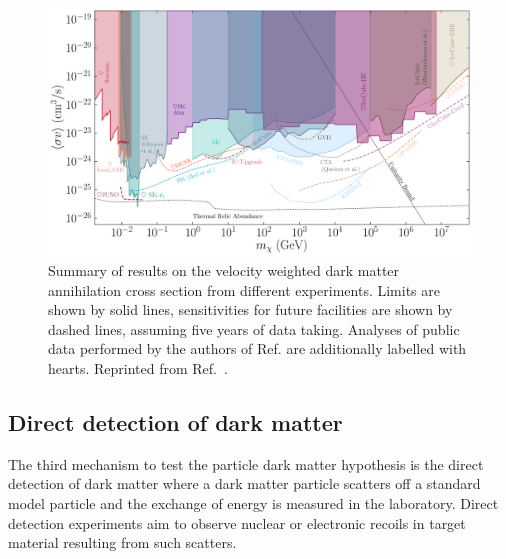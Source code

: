 \begin{figure}
    \centering
    \includegraphics[width=\linewidth]{figures/DMOverview/MainPlot.pdf}
    \caption{Summary of results on the velocity weighted dark matter annihilation cross section from different experiments. Limits are shown by solid lines, sensitivities for future facilities are shown by dashed lines, assuming five years of data taking. Analyses of public data performed by the authors of Ref.\cite{Arguelles:2019ouk} are additionally labelled with hearts. Reprinted from Ref.~\cite{Arguelles:2019ouk}.}
    \label{fig:DMOverview/DMAnnhillationCrossSection}
\end{figure}

\subsection{Direct detection of dark matter}\label{sec:DMOverview/DirectDetection}
The third mechanism to test the particle dark matter hypothesis is the direct detection of dark matter where a dark matter particle scatters off a standard model particle and the exchange of energy is measured in the laboratory. Direct detection experiments aim to observe nuclear or electronic recoils in target material resulting from such scatters.

